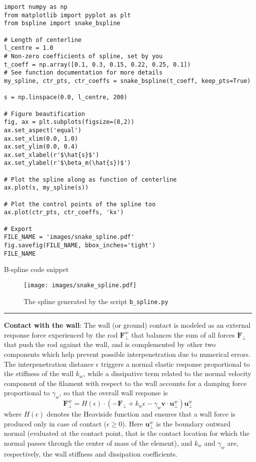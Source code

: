 \documentclass[11pt]{article}
\begin{document}
\begin{listing}[htbp]
\begin{verbatim}
import numpy as np
from matplotlib import pyplot as plt
from bspline import snake_bspline

# Length of centerline
l_centre = 1.0
# Non-zero coefficients of spline, set by you
t_coeff = np.array([0.1, 0.3, 0.15, 0.22, 0.25, 0.1])
# See function documentation for more details
my_spline, ctr_pts, ctr_coeffs = snake_bspline(t_coeff, keep_pts=True)

s = np.linspace(0.0, l_centre, 200)

# Figure beautification
fig, ax = plt.subplots(figsize=(8,2))
ax.set_aspect('equal')
ax.set_xlim(0.0, 1.0)
ax.set_ylim(0.0, 0.4)
ax.set_xlabel(r'$\hat{s}$')
ax.set_ylabel(r'$\beta_m(\hat{s})$')

# Plot the spline along as function of centerline
ax.plot(s, my_spline(s))

# Plot the control points of the spline too
ax.plot(ctr_pts, ctr_coeffs, 'kx')

# Export
FILE_NAME = 'images/snake_spline.pdf'
fig.savefig(FILE_NAME, bbox_inches='tight')
FILE_NAME
\end{verbatim}
\caption{\label{list_spline}
B-spline code snippet}
\end{listing}

\begin{figure}[htbp]
\centering
\texttt{[image: images/snake\_spline.pdf]}
\caption{\label{python_spline}
The spline generated by the script \texttt{b\_spline.py}}
\end{figure}

\noindent\rule{1\textwidth}{0.01pt}
\textbf{Contact with the wall}: The wall (or ground) contact is modeled as an external
response force experienced by the rod \(\mathbf{F}^w_{\perp}\) that balances
the sum of all forces \(\mathbf{F}_{\perp}\) that push the rod against the
wall, and is complemented by other two components which help prevent
possible interpenetration due to numerical errors. The interpenetration
distance \(\epsilon\) triggers a normal elastic response proportional to the
stiffness of the wall \(k_{w}\), while a dissipative term related to the
normal velocity component of the filament with respect to the wall accounts
for a damping force proportional to \(\gamma_w\), so that the overall wall
response is
\[ \mathbf{F}^w_{\perp}= H(\epsilon)\cdot(-\mathbf{F}_{\perp} +
	k_w\epsilon-\gamma_w\mathbf{v}\cdot
	\mathbf{u}^w_{\perp})\mathbf{u}^w_{\perp} \]
where \(H(\epsilon)\) denotes the Heaviside function and ensures that a wall
force is produced only in case of contact (\(\epsilon\ge0\)). Here
\(\mathbf{u}^w_{\perp}\) is the boundary outward normal (evaluated at the
contact point, that is the contact location for which the normal passes
through the center of mass of the element), and \(k_w\) and \(\gamma_w\) are,
respectively, the wall stiffness and dissipation coefficients.
\end{document}
